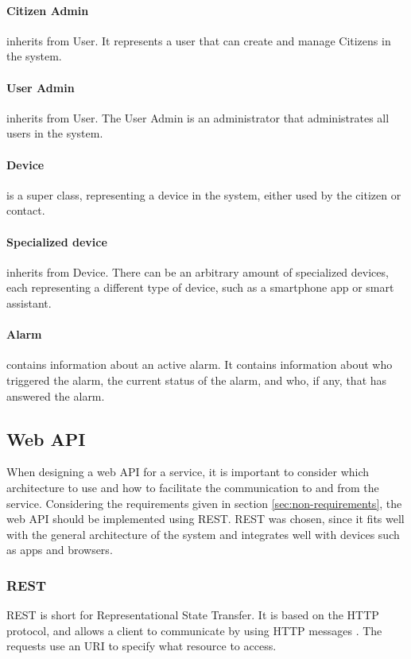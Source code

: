 \paragraph{Citizen Admin} inherits from User. It represents a user that can create and manage Citizens in the system.

\paragraph{User Admin} inherits from User. The User Admin is an administrator that administrates all users in the system.

\paragraph{Device} is a super class, representing a device in the system, either used by the citizen or contact.

\paragraph{Specialized device} inherits from Device. There can be an arbitrary amount of specialized devices, each representing a different type of device, such as a smartphone app or smart assistant.

\paragraph{Alarm} contains information about an active alarm. It contains information about who triggered the alarm, the current status of the alarm, and who, if any, that has answered the alarm.

\subsection{Web API}
When designing a web API for a service, it is important to consider which architecture to use and how to facilitate the communication to and from the service. Considering the requirements given in section \ref{sec:non-requirements}, the web API should be implemented using REST. REST was chosen, since it fits well with the general architecture of the system and integrates well with devices such as apps and browsers.

\subsubsection{REST}\label{sub:rest}
REST is short for Representational State Transfer. It is based on the HTTP protocol, and allows a client to communicate by using HTTP messages \cite{restapitutorial}\cite{restwikipedia}\cite{restbook}. The requests use an URI to specify what resource to access. 


